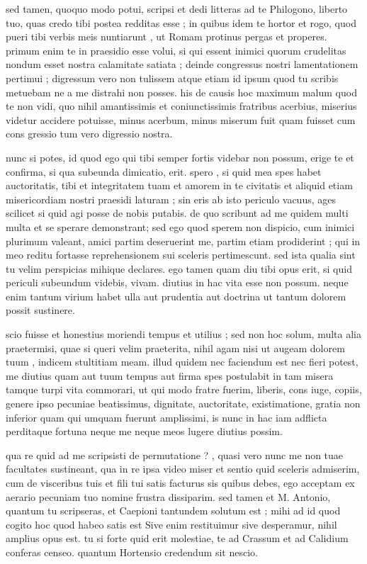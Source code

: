  sed tamen, quoquo modo potui, scripsi et dedi litteras ad te Philogono, liberto tuo, quas credo tibi postea redditas esse ; in quibus idem te hortor et rogo, quod pueri tibi verbis meis nuntiarunt , ut Romam protinus pergas et properes. primum enim te in praesidio esse volui, si qui essent inimici quorum crudelitas nondum esset nostra calamitate satiata ; deinde congressus nostri lamentationem pertimui ; digressum vero non tulissem atque etiam id ipsum quod tu scribis metuebam ne a me distrahi non posses. his de causis hoc maximum malum quod te non vidi, quo nihil amantissimis et coniunctissimis fratribus acerbius, miserius videtur accidere potuisse, minus acerbum, minus miserum fuit quam fuisset cum cons gressio tum vero digressio nostra.

 nunc si potes, id quod ego qui tibi semper fortis videbar non possum, erige te et confirma, si qua subeunda dimicatio, erit. spero , si quid mea spes habet auctoritatis, tibi et integritatem tuam et amorem in te civitatis et aliquid etiam misericordiam nostri praesidi laturam ; sin eris ab isto periculo vacuus, ages scilicet si quid agi posse de nobis putabis. de quo scribunt ad me quidem multi multa et se sperare demonstrant; sed ego quod sperem non dispicio, cum inimici plurimum valeant, amici partim deseruerint me, partim etiam prodiderint ; qui in meo reditu fortasse reprehensionem sui sceleris pertimescunt. sed ista qualia sint tu velim perspicias mihique declares. ego tamen quam diu tibi opus erit, si quid periculi subeundum videbis, vivam. diutius in hac vita esse non possum. neque enim tantum virium habet ulla aut prudentia aut doctrina ut tantum dolorem possit sustinere.

 scio fuisse et honestius moriendi tempus et utilius ; sed non hoc solum, multa alia praetermisi, quae si queri velim praeterita, nihil agam nisi ut augeam dolorem tuum , indicem stultitiam meam. illud quidem nec faciendum est nec fieri potest, me diutius quam aut tuum tempus aut firma spes postulabit in tam misera tamque turpi vita commorari, ut qui modo fratre fuerim, liberis, cons iuge, copiis, genere ipso pecuniae beatissimus, dignitate, auctoritate, existimatione, gratia non inferior quam qui umquam fuerunt amplissimi, is nunc in hac iam adflicta perditaque fortuna neque me neque meos lugere diutius possim.

 qua re quid ad me scripsisti de permutatione ? , quasi vero nunc me non tuae facultates sustineant, qua in re ipsa video miser et sentio quid sceleris admiserim, cum de visceribus tuis et fili tui satis facturus sis quibus debes, ego acceptam ex aerario pecuniam tuo nomine frustra dissiparim. sed tamen et M. Antonio, quantum tu scripseras, et Caepioni tantundem solutum est ; mihi ad id quod cogito hoc quod habeo satis est Sive enim restituimur sive desperamur, nihil amplius opus est. tu si forte quid erit molestiae, te ad Crassum et ad Calidium conferas censeo. quantum Hortensio credendum sit nescio.

